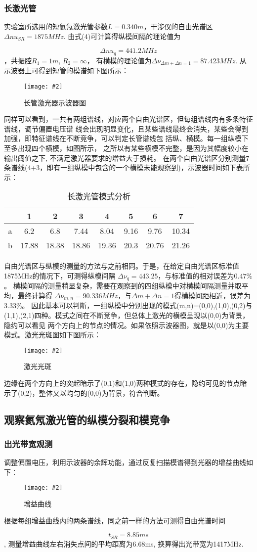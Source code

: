 \documentclass[12pt,a4paper]{article}
\newcommand{\be}[1]{
    \begin{equation}
        #1
    \end{equation}
}
\newcommand{\bfig}[3]{
    \begin{figure}[H]
        \centering
        \texttt{[image: \#2]}
        \caption{#3}
    \end{figure}
}
\begin{document}
\subsubsection{长激光管}
实验室所选用的短氦氖激光管参数$L=0.340m$，干涉仪的自由光谱区$\Delta nu_{SR}=1875MHz$. 由式(4)可计算得纵模间隔的理论值为
\be{\Delta nu_q=441.2MHz}，共振腔$R_1=1m$, $R_2=\infty$， 有横模的理论值为$\Delta \nu_{\Delta m+\Delta n=1}=87.423MHz$.
从示波器上可得到短管的模谱如下图所示：
\bfig{0.6}{长管激光器示意图.jpg}{长管激光器示波器图}
同样可以看到，一共有两组谱线，对应两个自由光谱区，但每组谱线内有多条特征谱线，调节偏置电压谱
线会出现明显变化，且某些谱线最终会消失，某些会得到加强，即特征谱线在不断竞争，可以判定长管谱线包
括纵、横模。每一组纵模下至多出现四个横模，如图所示，
之所以有某些横模不完整，是因为其幅度较小在输出阈值之下, 不满足激光器要求的增益大于损耗。
在两个自由光谱区分别测量7条谱线(4+3，即有一组纵模中包含的一个横模未能观察到)，示波器时间如下表所示：
\begin{table}[H]
    \begin{tabular}{|c|c|c|c|c|c|c|c|}
    \hline
      & 1     & 2     & 3     & 4     & 5    & 6     & 7     \\ \hline
    a & 6.2   & 6.8   & 7.44  & 8.04  & 9.16 & 9.76  & 10.34 \\ \hline
    b & 17.88 & 18.38 & 18.86 & 19.36 & 20.3 & 20.76 & 21.26 \\ \hline
    \end{tabular}
    \caption{长激光管模式分析}
    \end{table}
自由光谱区与纵模的测量的方法与之前相同。于是，在给定自由光谱区标准值1875MHz的情况下，可测得纵模间隔
$\Delta \nu_q=443.25$，与标准值的相对误差为$0.47\%$。
横模间隔的测量稍显复杂，需要在观察到的四组纵模中对横模间隔测量并取平均，最终计算得
$\Delta \nu_{m,n}=90.336MHz$，与$\Delta m+\Delta n=1$得横模间距相近，误差为$3.33\%$。
因此基本可以判断，一组纵模中分别出现的模式(m,n)=(0,0),(1,0),(0,2)与(1,1),(2,1)四种。模式之间在不断竞争，但总体上激光的横模呈现以(0,0)为背景，隐约可以看见
两个方向上的节点的情况。如果依照示波器图，就是以(0,0)为主要模式。激光光斑图如下图所示：
\bfig{0.5}{激光光斑.jpg}{激光光斑}
边缘在两个方向上的突起暗示了(0,1)和(1,0)两种模式的存在，隐约可见的节点暗示了(0,2)，整体又以均匀的(0,0)为背景，符合判断。
\subsection{观察氦氖激光管的纵模分裂和模竞争}
\subsubsection{出光带宽观测}
调整偏置电压，利用示波器的余辉功能，通过反复扫描模谱得到光器的增益曲线如下：
\bfig{0.5}{增益曲线.jpg}{增益曲线}
根据每组增益曲线内的两条谱线，同之前一样的方法可测得自由光谱时间
\be{t_{SR}=8.85ms}, 测量增益曲线左右消失点间的平均距离为6.68ms, 换算得出光带宽为1417MHz.
\end{document}
